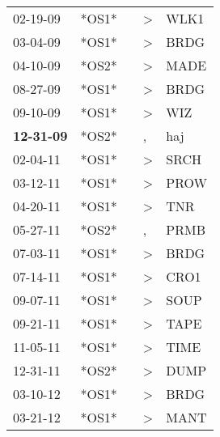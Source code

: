 \begin{supertabular}{p{0.07\textwidth}p{0.06\textwidth}p{0.02\textwidth}p{0.02\textwidth}p{0.06\textwidth}}
          02-19-09\textsuperscript{} &  *OS1* &   &  \textgreater &           WLK1\textsuperscript{} \\
          03-04-09\textsuperscript{} &  *OS1* &   &  \textgreater &           BRDG\textsuperscript{} \\
          04-10-09\textsuperscript{} &  *OS2* &   &  \textgreater &           MADE\textsuperscript{} \\
          08-27-09\textsuperscript{} &  *OS1* &   &  \textgreater &           BRDG\textsuperscript{} \\
          09-10-09\textsuperscript{} &  *OS1* &   &  \textgreater &            WIZ\textsuperscript{} \\
 \textbf{12-31-09\textsuperscript{}} &  *OS2* &   &             , &            haj\textsuperscript{} \\
          02-04-11\textsuperscript{} &  *OS1* &   &  \textgreater &           SRCH\textsuperscript{} \\
          03-12-11\textsuperscript{} &  *OS1* &   &  \textgreater &           PROW\textsuperscript{} \\
          04-20-11\textsuperscript{} &  *OS1* &   &  \textgreater &            TNR\textsuperscript{} \\
          05-27-11\textsuperscript{} &  *OS2* &   &             , &           PRMB\textsuperscript{} \\
          07-03-11\textsuperscript{} &  *OS1* &   &  \textgreater &           BRDG\textsuperscript{} \\
          07-14-11\textsuperscript{} &  *OS1* &   &  \textgreater &           CRO1\textsuperscript{} \\
          09-07-11\textsuperscript{} &  *OS1* &   &  \textgreater &           SOUP\textsuperscript{} \\
          09-21-11\textsuperscript{} &  *OS1* &   &  \textgreater &           TAPE\textsuperscript{} \\
          11-05-11\textsuperscript{} &  *OS1* &   &  \textgreater &           TIME\textsuperscript{} \\
          12-31-11\textsuperscript{} &  *OS2* &   &  \textgreater &           DUMP\textsuperscript{} \\
          03-10-12\textsuperscript{} &  *OS1* &   &  \textgreater &           BRDG\textsuperscript{} \\
          03-21-12\textsuperscript{} &  *OS1* &   &  \textgreater &           MANT\textsuperscript{} \\

\end{supertabular}

